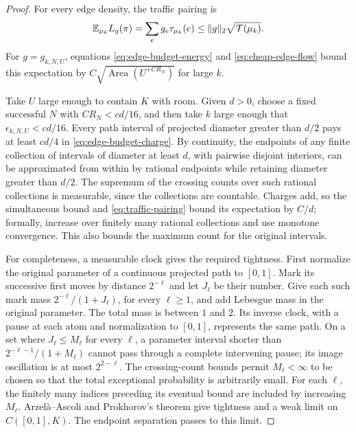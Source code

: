 \begin{proof}
For every edge density, the traffic pairing is
\begin{equation}\label{eq:traffic-pairing}
 \mathbb E_{\mu_k}L_g(\pi)
   =\sum_e g_e\tau_{\mu_k}(e)
   \le\lVert g\rVert_2\sqrt{\mathcal T(\mu_k)}.
\end{equation}
For \(g=g_{k,N,U}\), equations \eqref{eq:edge-budget-energy} and
\eqref{eq:cheap-edge-flow} bound this expectation by
\(C\sqrt{\operatorname{Area}(U^{+CR_N})}\) for large \(k\).

Take \(U\) large enough to contain \(K\) with room.  Given \(d>0\), choose
a fixed successful \(N\) with \(CR_N<cd/16\), and then take \(k\) large
enough that \(\epsilon_{k,N,U}<cd/16\).  Every path interval of projected
diameter greater than \(d/2\) pays at least \(cd/4\) in
\eqref{eq:edge-budget-charge}.  By continuity, the endpoints of any finite
collection of intervals of diameter at least \(d\), with pairwise disjoint
interiors, can be approximated from within by rational endpoints while
retaining diameter greater than \(d/2\).  The supremum of the crossing
counts over such rational collections is measurable, since the collections
are countable.  Charges add, so the simultaneous bound and
\eqref{eq:traffic-pairing} bound its expectation by \(C/d\); formally,
increase over finitely many rational collections and use monotone
convergence.  This also bounds the maximum count for the original
intervals.

For completeness, a measurable clock gives the required tightness.
First normalize the original parameter of a continuous projected path to
\([0,1]\).  Mark its successive first moves by
distance \(2^{-\ell}\) and let \(J_\ell\) be their number.  Give each such
mark mass \(2^{-\ell}/(1+J_\ell)\), for every \(\ell\ge1\), and add
Lebesgue mass in the original parameter.  The total mass is between \(1\)
and \(2\).  Its inverse clock, with a pause at each atom and normalization
to \([0,1]\), represents the same path.  On a set where
\(J_\ell\le M_\ell\) for every \(\ell\), a parameter interval shorter than
\(2^{-\ell-1}/(1+M_\ell)\) cannot pass through a complete intervening
pause; its image oscillation is at most \(2^{2-\ell}\).
The crossing-count bounds permit \(M_\ell<\infty\) to be chosen so that
the total exceptional probability is arbitrarily small.  For each
\(\ell\), the finitely many indices preceding its eventual bound are
included by increasing \(M_\ell\).  Arzel\`a--Ascoli and Prokhorov's
theorem give tightness and a weak limit on \(C([0,1],K)\).  The endpoint
separation passes to this limit.


\end{proof}
